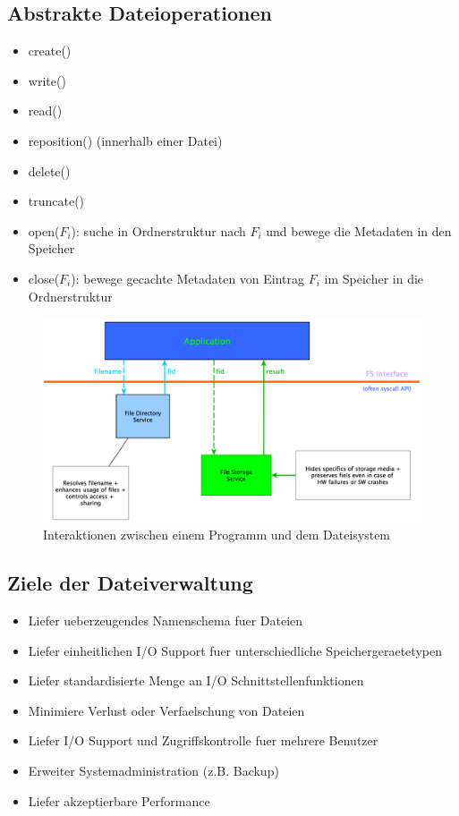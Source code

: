 \documentclass[a4paper]{scrreprt}
\begin{document}
\subsection{Abstrakte Dateioperationen}
\begin{itemize}
	\item create()
	\item write()
	\item read()
	\item reposition() (innerhalb einer Datei)
	\item delete()
	\item truncate()
	\item open($F_i$): suche in Ordnerstruktur nach $F_i$ und bewege die Metadaten in den Speicher
	\item close($F_i$): bewege gecachte Metadaten von Eintrag $F_i$ im Speicher in die Ordnerstruktur
\end{itemize}

\begin{figure}[ht]
\centering
\includegraphics[scale=0.35]{graphics/filesystem_interaction.png}
\caption{Interaktionen zwischen einem Programm und dem Dateisystem}
\end{figure}

\subsection{Ziele der Dateiverwaltung}
\begin{itemize}
	\item Liefer ueberzeugendes Namenschema fuer Dateien
	\item Liefer einheitlichen I/O Support fuer unterschiedliche Speichergeraetetypen
	\item Liefer standardisierte Menge an I/O Schnittstellenfunktionen
	\item Minimiere Verlust oder Verfaelschung von Dateien
	\item Liefer I/O Support und Zugriffskontrolle fuer mehrere Benutzer
	\item Erweiter Systemadministration (z.B. Backup)
	\item Liefer akzeptierbare Performance
\end{itemize}
\end{document}

